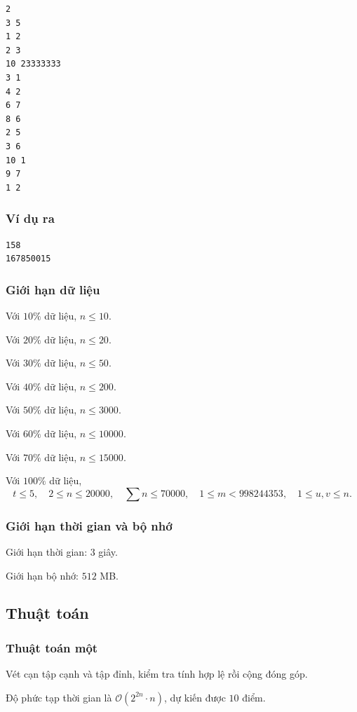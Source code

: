 \documentclass[11pt]{article}
\newcommand{\Oh}{\mathcal{O}}
\begin{document}
\begin{verbatim}
2
3 5
1 2
2 3
10 23333333
3 1
4 2
6 7
8 6
2 5
3 6
10 1
9 7
1 2
\end{verbatim}

\subsubsection{Ví dụ ra}

\begin{verbatim}
158
167850015
\end{verbatim}

\subsubsection{Giới hạn dữ liệu}

Với \(10\%\) dữ liệu, \(n\le 10\).

Với \(20\%\) dữ liệu, \(n\le 20\).

Với \(30\%\) dữ liệu, \(n\le 50\).

Với \(40\%\) dữ liệu, \(n\le 200\).

Với \(50\%\) dữ liệu, \(n\le 3000\).

Với \(60\%\) dữ liệu, \(n\le 10000\).

Với \(70\%\) dữ liệu, \(n\le 15000\).

Với \(100\%\) dữ liệu,
\[
  t\le 5,\quad 2\le n\le 20000,\quad \sum n\le 70000,\quad
  1\le m<998244353,\quad 1\le u,v\le n.
\]

\subsubsection{Giới hạn thời gian và bộ nhớ}

Giới hạn thời gian: \(3\) giây.

Giới hạn bộ nhớ: \(512\) MB.

\subsection{Thuật toán}

\subsubsection{Thuật toán một}

Vét cạn tập cạnh và tập đỉnh, kiểm tra tính hợp lệ rồi cộng đóng góp.

Độ phức tạp thời gian là \(\Oh(2^{2n}\cdot n)\), dự kiến được \(10\) điểm.
\end{document}
